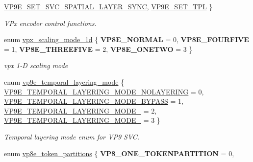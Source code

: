 \begin{DoxyCompactItemize}
\hyperlink{group__vp8__encoder_gga6deae3d561c838952552c3d3756322eca75400bbb30c8e4c3690446bea6ac2be3}{V\+P9\+E\+\_\+\+S\+E\+T\+\_\+\+S\+V\+C\+\_\+\+S\+P\+A\+T\+I\+A\+L\+\_\+\+L\+A\+Y\+E\+R\+\_\+\+S\+Y\+NC}, 
\hyperlink{group__vp8__encoder_gga6deae3d561c838952552c3d3756322eca8cc35557a64db25075d35e2b34373864}{V\+P9\+E\+\_\+\+S\+E\+T\+\_\+\+T\+PL}
 \}\begin{DoxyCompactList}\small\item\em V\+Px encoder control functions. \end{DoxyCompactList}
\item 
enum \hyperlink{group__vp8__encoder_ga70071b1bb6cac9a1ef0ea3d8362ff94f}{vpx\+\_\+scaling\+\_\+mode\+\_\+1d} \{ {\bfseries V\+P8\+E\+\_\+\+N\+O\+R\+M\+AL} = 0, 
{\bfseries V\+P8\+E\+\_\+\+F\+O\+U\+R\+F\+I\+VE} = 1, 
{\bfseries V\+P8\+E\+\_\+\+T\+H\+R\+E\+E\+F\+I\+VE} = 2, 
{\bfseries V\+P8\+E\+\_\+\+O\+N\+E\+T\+WO} = 3
 \}\begin{DoxyCompactList}\small\item\em vpx 1-\/D scaling mode \end{DoxyCompactList}
\item 
enum \hyperlink{group__vp8__encoder_gabe875c0c3993e488ffb342cf548a8ce8}{vp9e\+\_\+temporal\+\_\+layering\+\_\+mode} \{ \hyperlink{group__vp8__encoder_ggabe875c0c3993e488ffb342cf548a8ce8ac9713fea328d8c59130250a6d5b35add}{V\+P9\+E\+\_\+\+T\+E\+M\+P\+O\+R\+A\+L\+\_\+\+L\+A\+Y\+E\+R\+I\+N\+G\+\_\+\+M\+O\+D\+E\+\_\+\+N\+O\+L\+A\+Y\+E\+R\+I\+NG} = 0, 
\hyperlink{group__vp8__encoder_ggabe875c0c3993e488ffb342cf548a8ce8a680204f7c9d48155170bcb3fc6e673e8}{V\+P9\+E\+\_\+\+T\+E\+M\+P\+O\+R\+A\+L\+\_\+\+L\+A\+Y\+E\+R\+I\+N\+G\+\_\+\+M\+O\+D\+E\+\_\+\+B\+Y\+P\+A\+SS} = 1, 
\hyperlink{group__vp8__encoder_ggabe875c0c3993e488ffb342cf548a8ce8a7bb06aacd0b926d40a7df261fa2937b9}{V\+P9\+E\+\_\+\+T\+E\+M\+P\+O\+R\+A\+L\+\_\+\+L\+A\+Y\+E\+R\+I\+N\+G\+\_\+\+M\+O\+D\+E\+\_} = 2, 
\hyperlink{group__vp8__encoder_ggabe875c0c3993e488ffb342cf548a8ce8ad2a4ba7d6535ce3514fec130c806d457}{V\+P9\+E\+\_\+\+T\+E\+M\+P\+O\+R\+A\+L\+\_\+\+L\+A\+Y\+E\+R\+I\+N\+G\+\_\+\+M\+O\+D\+E\+\_} = 3
 \}\begin{DoxyCompactList}\small\item\em Temporal layering mode enum for V\+P9 S\+VC. \end{DoxyCompactList}
\item 
enum \hyperlink{group__vp8__encoder_ga5f7508ba3fb453b47f62313ed0b864d2}{vp8e\+\_\+token\+\_\+partitions} \{ {\bfseries V\+P8\+\_\+\+O\+N\+E\+\_\+\+T\+O\+K\+E\+N\+P\+A\+R\+T\+I\+T\+I\+ON} = 0, 

\end{DoxyCompactItemize}

